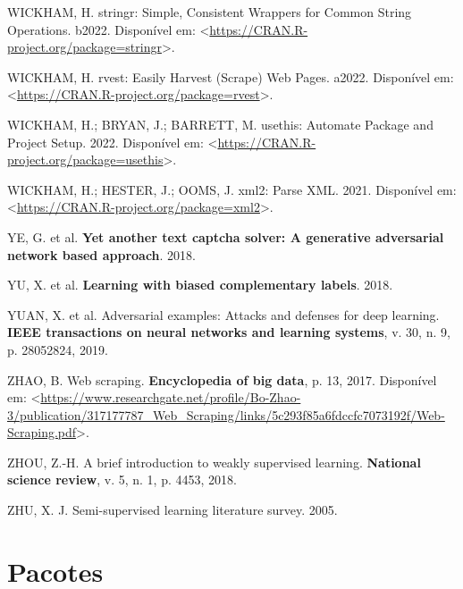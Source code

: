 \documentclass[12pt,twoside,brazilian]{book}
\newlength{\cslhangindent}
\newlength{\cslentryspacingunit} %
\newenvironment{CSLReferences}[2] %
 {%
  \setlength{\parindent}{0pt}
  \ifodd #1
  \let\oldpar\par
  \def\par{\hangindent=\cslhangindent\oldpar}
  \fi
  \setlength{\parskip}{#2\cslentryspacingunit}
 }%
 {}
\begin{document}
\begin{CSLReferences}{0}{1}
\leavevmode{}%
WICKHAM, H. stringr: Simple, Consistent Wrappers for Common String
Operations. b2022. Disponível em:
\textless{}\url{https://CRAN.R-project.org/package=stringr}\textgreater.

\leavevmode{}%
WICKHAM, H. rvest: Easily Harvest (Scrape) Web Pages. a2022. Disponível
em:
\textless{}\url{https://CRAN.R-project.org/package=rvest}\textgreater.

\leavevmode{}%
WICKHAM, H.; BRYAN, J.; BARRETT, M. usethis: Automate Package and
Project Setup. 2022. Disponível em:
\textless{}\url{https://CRAN.R-project.org/package=usethis}\textgreater.

\leavevmode{}%
WICKHAM, H.; HESTER, J.; OOMS, J. xml2: Parse XML. 2021. Disponível em:
\textless{}\url{https://CRAN.R-project.org/package=xml2}\textgreater.

\leavevmode{}%
YE, G. et al. \textbf{Yet another text captcha solver: A generative
adversarial network based approach}. 2018.

\leavevmode{}%
YU, X. et al. \textbf{Learning with biased complementary labels}. 2018.

\leavevmode{}%
YUAN, X. et al. Adversarial examples: Attacks and defenses for deep
learning. \textbf{IEEE transactions on neural networks and learning
systems}, v. 30, n. 9, p. 28052824, 2019.

\leavevmode{}%
ZHAO, B. Web scraping. \textbf{Encyclopedia of big data}, p. 13, 2017.
Disponível em:
\textless{}\url{https://www.researchgate.net/profile/Bo-Zhao-3/publication/317177787_Web_Scraping/links/5c293f85a6fdccfc7073192f/Web-Scraping.pdf}\textgreater.

\leavevmode{}%
ZHOU, Z.-H. A brief introduction to weakly supervised learning.
\textbf{National science review}, v. 5, n. 1, p. 4453, 2018.

\leavevmode{}%
ZHU, X. J. Semi-supervised learning literature survey. 2005.

\end{CSLReferences}

\appendix
{}

\hypertarget{sec-pacote}{%
\chapter{Pacotes}\label{sec-pacote}}
\end{document}
